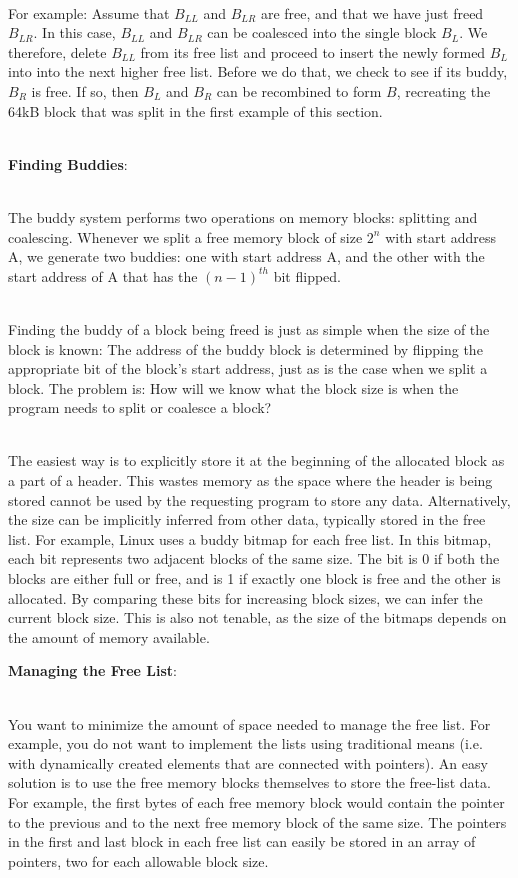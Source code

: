 \documentclass[12pt]{extarticle}
\newenvironment{myindentpar}[1]%
 {\begin{list}{}%
         {\setlength{\leftmargin}{#1}}%
         \item[]%
 }
 {\end{list}}
\begin{document}
\begin{myindentpar}{6.5mm}
    \ \\
    For example: Assume that $B_{LL}$ and $B_{LR}$ are free, and that we have just freed $B_{LR}$.  In this case, $B_{LL}$ and $B_{LR}$ can be coalesced into the single block $B_{L}$.  We therefore, delete $B_{LL}$ from its free list and proceed to insert the newly formed $B_{L}$ into into the next higher free list.  Before we do that, we check to see if its buddy, $B_{R}$ is free.  If so, then $B_{L}$ and $B_{R}$ can be recombined to form $B$, recreating the 64kB block that was split in the first example of this section.  
    
    \ \\
    \textbf{Finding Buddies}:
    
    \ \\
    The buddy system performs two operations on memory blocks: splitting and coalescing.  Whenever we split a free memory block of size $2^{n}$ with start address A, we generate two buddies: one with start address A, and the other with the start address of A that has the $(n-1)^{th}$ bit flipped.  
    
    \ \\
    Finding the buddy of a block being freed is just as simple when the size of the block is known: The address of the buddy block is determined by flipping the appropriate bit of the block's start address, just as is the case when we split a block.  The problem is: How will we know what the block size is when the program needs to split or coalesce a block?
    
    \ \\
    The easiest way is to explicitly store it at the beginning of the allocated block as a part of a header.  This wastes memory as the space where the header is being stored cannot be used by the requesting program to store any data.  Alternatively, the size can be implicitly inferred from other data, typically stored in the free list.  For example, Linux uses a buddy bitmap for each free list.  In this bitmap, each bit represents two adjacent blocks of the same size.  The bit is 0 if both the blocks are either full or free, and is 1 if exactly one block is free and the other is allocated.  By comparing these bits for increasing block sizes, we can infer the current block size.  This is also not tenable, as the size of the bitmaps depends on the amount of memory available.  
    
    \newpage
    \noindent
    \textbf{Managing the Free List}:
    
    \ \\
    You want to minimize the amount of space needed to manage the free list.  For example, you do not want to implement the lists using traditional means (i.e. with dynamically created elements that are connected with pointers).  An easy solution is to use the free memory blocks themselves to store the free-list data.  For example, the first bytes of each free memory block would contain the pointer to the previous and to the next free memory block of the same size.  The pointers in the first and last block in each free list can easily be stored in an array of pointers, two for each allowable block size.  
    

\end{myindentpar}
\end{document}
